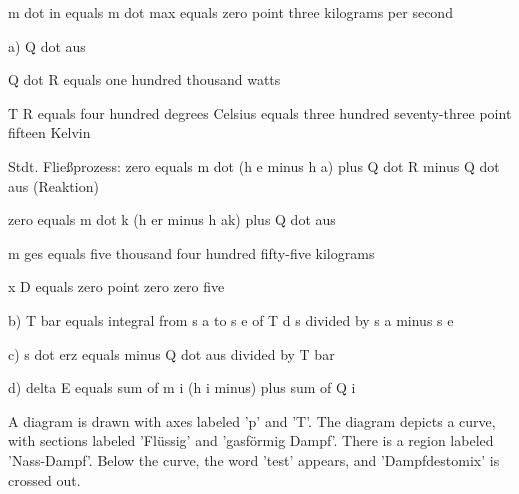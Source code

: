 m dot in equals m dot max equals zero point three kilograms per second

a) Q dot aus

Q dot R equals one hundred thousand watts

T R equals four hundred degrees Celsius equals three hundred seventy-three point fifteen Kelvin

Stdt. Fließprozess: zero equals m dot (h e minus h a) plus Q dot R minus Q dot aus (Reaktion)

zero equals m dot k (h er minus h ak) plus Q dot aus

m ges equals five thousand four hundred fifty-five kilograms

x D equals zero point zero zero five

b) T bar equals integral from s a to s e of T d s divided by s a minus s e

c) s dot erz equals minus Q dot aus divided by T bar

d) delta E equals sum of m i (h i minus) plus sum of Q i

A diagram is drawn with axes labeled 'p' and 'T'. The diagram depicts a curve, with sections labeled 'Flüssig' and 'gasförmig Dampf'. There is a region labeled 'Nass-Dampf'. Below the curve, the word 'test' appears, and 'Dampfdestomix' is crossed out.